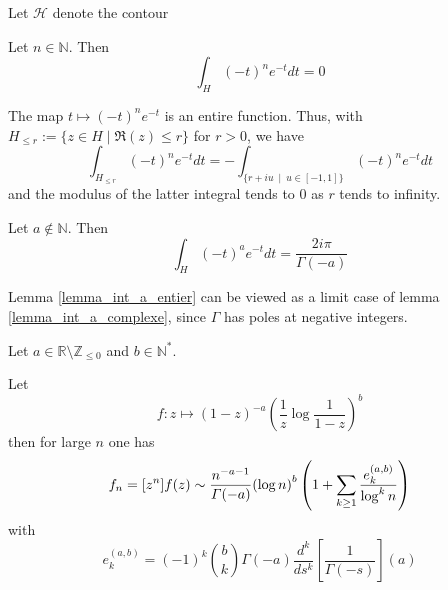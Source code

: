 \documentclass[../main.tex]{subfiles}
\begin{document}
Let $\mathcal{H}$ denote the contour

\begin{lemma}{}\label{lemma_int_a_entier}
	Let $n \in \mathbb{N}$.
	Then $$\int_H {(-t)}^n e^{-t} dt = 0$$
	
	\tcblower
	
	The map $t \mapsto {(-t)}^n e^{-t}$ is an entire function. Thus, with $H_{\leq r} := \{z \in H \mid \Re(z) \leq r\}$ for $r > 0$, we have
	$$
	\int_{H_{\leq r}} {(-t)}^n e^{-t}dt = -\int_{\{r + iu ~\mid~ u \in [-1, 1]\}} {(-t)}^n e^{-t} dt
	$$
	and the modulus of the latter integral tends to 0 as $r$ tends to infinity.
\end{lemma}

\begin{lemma}{}\label{lemma_int_a_complexe}
	Let $a \not\in \mathbb{N}$.
	Then $$\int_H {(-t)}^a e^{-t} dt = \frac{2i\pi}{\Gamma(-a)}$$
\end{lemma}

\begin{remark}
	Lemma \ref{lemma_int_a_entier} can be viewed as a limit case of lemma \ref{lemma_int_a_complexe}, since $\Gamma$ has poles at negative integers.
\end{remark}

\begin{thm}{}
	Let $a \in \mathbb{R} \setminus \mathbb{Z}_{\leq 0}$ and $b \in \mathbb{N}^*$.
	
	Let
	\[
	f : z \mapsto {(1 - z)}^{-a} {\left( \frac{1}{z} \log \frac{1}{1 - z} \right)}^b
	\]
	then for large $n$ one has
	$$f_n = [z^n] f(z) \sim
	\frac{n^{-a -1}}{\Gamma(-a)}
	{(\log n)}^b
	\left(1 + \sum\limits_{k \geq 1} \frac{e_k^{(a, b)}}{\log^k n} \right)$$
	with
	$$
	e_k^{(a, b)} = {(-1)}^k {b \choose k} \Gamma(-a) \frac{d^k}{ds^k} \left[ \frac{1}{\Gamma(-s)} \right] (a)
	$$
\end{thm}
\end{document}
